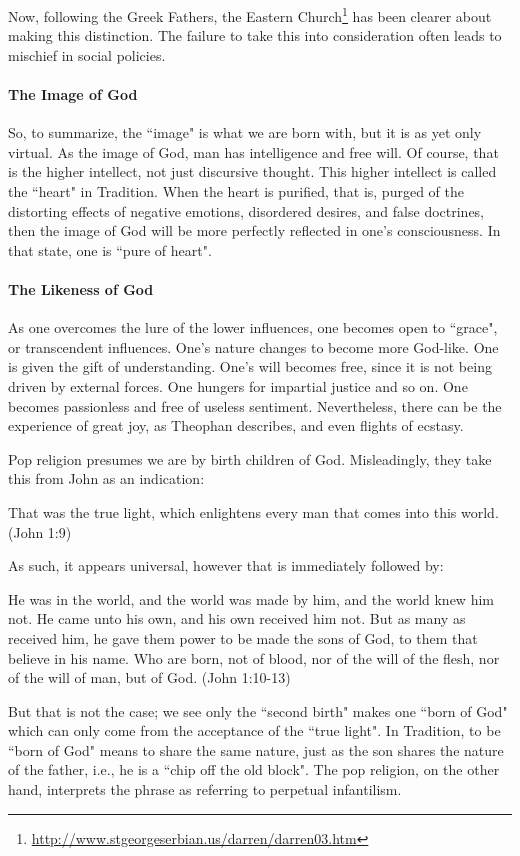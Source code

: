 Now, following the Greek Fathers, the Eastern Church\footnote{\url{http://www.stgeorgeserbian.us/darren/darren03.htm}} has been clearer about making this distinction. The failure to take this into consideration often leads to mischief in social policies.

\paragraph{The Image of God}
So, to summarize, the ``image" is what we are born with, but it is as yet only virtual. As the image of God, man has intelligence and free will. Of course, that is the higher intellect, not just discursive thought. This higher intellect is called the ``heart" in Tradition. When the heart is purified, that is, purged of the distorting effects of negative emotions, disordered desires, and false doctrines, then the image of God will be more perfectly reflected in one's consciousness. In that state, one is ``pure of heart".

\paragraph{The Likeness of God}
As one overcomes the lure of the lower influences, one becomes open to ``grace", or transcendent influences. One's nature changes to become more God-like. One is given the gift of understanding. One's will becomes free, since it is not being driven by external forces. One hungers for impartial justice and so on. One becomes passionless and free of useless sentiment. Nevertheless, there can be the experience of great joy, as Theophan describes, and even flights of ecstasy.

Pop religion presumes we are by birth children of God. Misleadingly, they take this from John as an indication:

\begin{quotex}
That was the true light, which enlightens every man that comes into this world. (John 1:9) 

\end{quotex}
As such, it appears universal, however that is immediately followed by:

\begin{quotex}
He was in the world, and the world was made by him, and the world knew him not. He came unto his own, and his own received him not. But as many as received him, he gave them power to be made the sons of God, to them that believe in his name. Who are born, not of blood, nor of the will of the flesh, nor of the will of man, but of God. (John 1:10-13) 

\end{quotex}
But that is not the case; we see only the ``second birth" makes one ``born of God" which can only come from the acceptance of the ``true light". In Tradition, to be ``born of God" means to share the same nature, just as the son shares the nature of the father, i.e., he is a ``chip off the old block". The pop religion, on the other hand, interprets the phrase as referring to perpetual infantilism.

